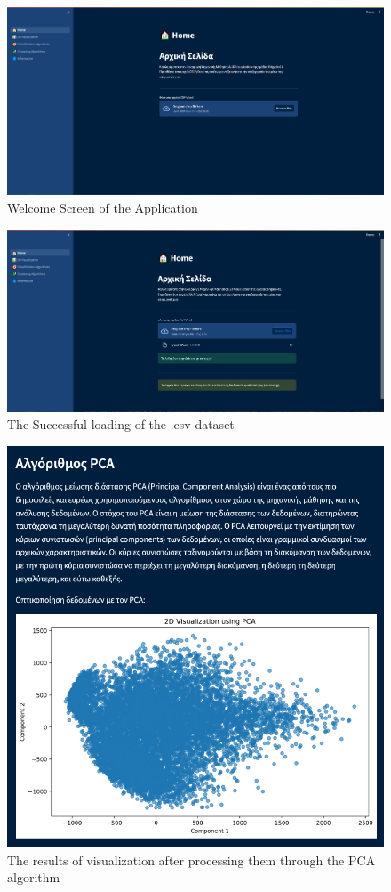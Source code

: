 \documentclass[unnumsec,webpdf,contemporary,large]{oup-authoring-template}%
\theoremstyle{thmstyleone}%
\theoremstyle{thmstyletwo}%
\theoremstyle{thmstylethree}%
\begin{document}
\begin{figure}
    \centering
    \includegraphics[width=1\linewidth]{images/welcoming-screen.png}
    \caption{Welcome Screen of the Application}
    \label{fig:welcome-screen}
\end{figure}

\begin{figure}
    \centering
    \includegraphics[width=1\linewidth]{images/csv-loaded.jpg}
    \caption{The Successful loading of the .csv dataset}
    \label{fig:csv-loaded}
\end{figure}

\begin{figure}
    \centering
    \includegraphics[width=0.9\linewidth]{images/pca.png}
    \caption{The results of visualization after processing them through the PCA algorithm}
    \label{fig:pca}
\end{figure}
\end{document}
